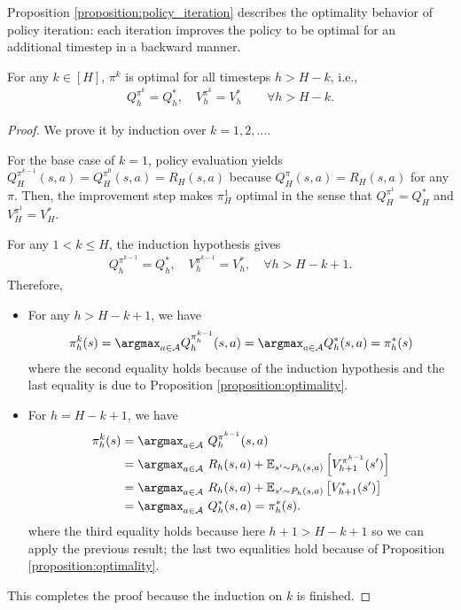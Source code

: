 Proposition \ref{proposition:policy_iteration} describes the optimality behavior of policy iteration: each iteration improves the policy to be optimal for an additional timestep in a backward manner.
\begin{proposition}\label{proposition:policy_iteration}
For any $k \in [H]$, $\pi^k$  is optimal for all timesteps $h>H-k$, i.e.,
\begin{align*}
Q_h^{\pi^k}=Q_h^*, \quad V_h^{\pi^k}=V_h^* \qquad \forall h>H-k .
\end{align*}
\end{proposition}
\begin{proof}
We prove it by induction over $k=1,2,\ldots$.

For the base case of $k=1$, policy evaluation yields $Q_H^{\pi^{k-1}}(s, a)=Q_H^{\pi^0}(s, a)=R_H(s, a)$ because $Q_H^\pi(s, a)=R_H(s, a)$ for any $\pi$. Then, the improvement step makes $\pi_H^1$ optimal in the sense that $Q_H^{\pi^1}=Q_H^*$ and  $V_H^{\pi^1}=V_H^*$.

For any $1<k \leq H$, the induction hypothesis gives
\begin{align*}
    Q_h^{\pi^{k-1}}=Q_h^*, \quad V_h^{\pi^{k-1}}=V^*_h, \quad \forall h>H-k+1 .
\end{align*}
Therefore,
\begin{itemize}
    \item For any $h>H-k+1$, we have 
    \begin{align*}
        \pi_h^k(s)=\argmax_{a\in\mathcal{A}} Q_h^{\pi_h^{k-1}}(s, a)=\argmax_{a\in\mathcal{A}} Q_h^*(s, a)=\pi_h^*(s)
    \end{align*}
    where the second equality holds because of the induction hypothesis and the last equality is due to Proposition \ref{proposition:optimality}.
    \item For $h=H-k+1$, we have 
    \begin{align*}
\pi_h^k(s) & =\argmax_{a\in\mathcal{A}}~ Q_h^{\pi^{k-1}}(s, a) \\
& =\argmax_{a\in\mathcal{A}} ~ R_h(s, a)+\mathbb{E}_{s^{\prime} \sim P_h(s, a)}\left[V _ { h + 1 } ^ { \pi ^ { k - 1 } } (s')\right] \\
& =\argmax_{a\in\mathcal{A}} ~ R_h(s, a)+\mathbb{E}_{s^{\prime} \sim P_h(s, a)}\left[V_{h+1}^*(s')\right] \\
& =\argmax_{a\in\mathcal{A}} ~ Q_h^*(s, a) 
=\pi_h^*(s)
.
\end{align*}
 where the third equality holds because
 here $h+1>H-k+1$ so we can apply the previous result;
 the last two equalities hold because of Proposition \ref{proposition:optimality}.
\end{itemize}
This completes the proof because the induction on $k$ is finished.
\end{proof}


